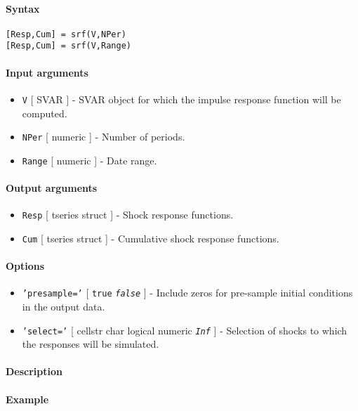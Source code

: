 


	\paragraph{Syntax}

\begin{verbatim}
[Resp,Cum] = srf(V,NPer)
[Resp,Cum] = srf(V,Range)
\end{verbatim}

\paragraph{Input arguments}

\begin{itemize}
\item
  \texttt{V} {[} SVAR {]} - SVAR object for which the impulse response
  function will be computed.
\item
  \texttt{NPer} {[} numeric {]} - Number of periods.
\item
  \texttt{Range} {[} numeric {]} - Date range.
\end{itemize}

\paragraph{Output arguments}

\begin{itemize}
\item
  \texttt{Resp} {[} tseries \textbar{} struct {]} - Shock response
  functions.
\item
  \texttt{Cum} {[} tseries \textbar{} struct {]} - Cumulative shock
  response functions.
\end{itemize}

\paragraph{Options}

\begin{itemize}
\item
  \texttt{'presample='} {[} \texttt{true} \textbar{}
  \emph{\texttt{false}} {]} - Include zeros for pre-sample initial
  conditions in the output data.
\item
  \texttt{'select='} {[} cellstr \textbar{} char \textbar{} logical
  \textbar{} numeric \textbar{} \emph{\texttt{Inf}} {]} - Selection of
  shocks to which the responses will be simulated.
\end{itemize}

\paragraph{Description}

\paragraph{Example}


